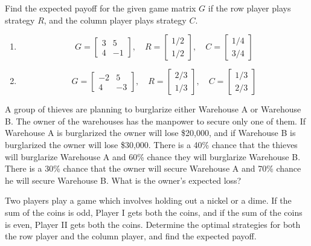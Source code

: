 \begin{puzzle}
    Find the expected payoff for the given game matrix \( G \) if the row player plays strategy \( R \), and the column player plays strategy \( C \).
    \begin{enumerate}
        \item \[ G = \begin{bmatrix} 3 & 5 \\ 4 & -1 \end{bmatrix} , \quad R = \begin{bmatrix} 1/2 \\ 1/2 \end{bmatrix} , \quad C = \begin{bmatrix} 1/4 \\ 3/4 \end{bmatrix} \]
        \item \[ G = \begin{bmatrix} -2 & 5 \\ 4 & -3 \end{bmatrix} , \quad R = \begin{bmatrix} 2/3 \\ 1/3 \end{bmatrix} , \quad C = \begin{bmatrix} 1/3 \\ 2/3 \end{bmatrix} \]
    \end{enumerate}
\end{puzzle}

\begin{puzzle}
    A group of thieves are planning to burglarize either Warehouse A or Warehouse B. The owner of the warehouses has the manpower to secure only one of them. If Warehouse A is burglarized the owner will lose \$20,000, and if Warehouse B is burglarized the owner will lose \$30,000. There is a 40\% chance that the thieves will burglarize Warehouse A and 60\% chance they will burglarize Warehouse B. There is a 30\% chance that the owner will secure Warehouse A and 70\% chance he will secure Warehouse B. What is the owner’s expected loss?
\end{puzzle}

\begin{puzzle}
    Two players play a game which involves holding out a nickel or a dime. If the sum of the coins is odd, Player I gets both the coins, and if the sum of the coins is even, Player II gets both the coins. Determine the optimal strategies for both the row player and the column player, and find the expected payoff.
\end{puzzle}

